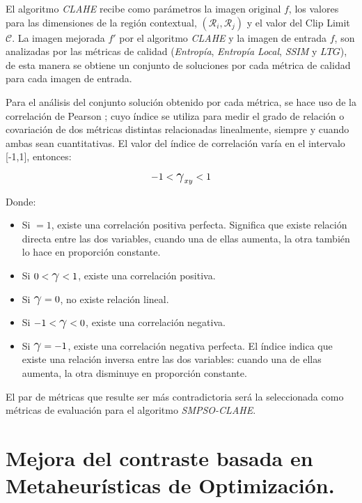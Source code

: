 El algoritmo \textit{CLAHE} recibe como parámetros la imagen original $f$, los valores para las dimensiones de la región contextual,  $(\mathcal{R}_i,\mathcal{R}_j)$ y el valor del Clip Limit $\mathscr{C}$. 
La imagen mejorada $f'$ por el algoritmo \textit{CLAHE} y la imagen de entrada $f$, son analizadas por las métricas de calidad (\textit{Entropía}, \textit{Entropía Local}, \textit{SSIM} y $LTG$), de esta manera se obtiene un conjunto de soluciones por cada métrica de calidad para cada imagen de entrada.

Para el análisis del conjunto solución obtenido por cada métrica, se hace uso de la correlación de Pearson \cite{correlacion}; cuyo índice se utiliza para medir el grado de relación o covariación de dos métricas distintas relacionadas linealmente, siempre y cuando ambas sean cuantitativas. El valor del índice de correlación varía en el intervalo [-1,1], entonces:


\begin{equation}\label{eq:correlacion}
-1 < \text{\Large{$\gamma$}}_{xy} < 1
\end{equation}

Donde:
\begin{itemize}
\item Si \text{\Large{$\gamma$}}$= 1$, existe una correlación positiva perfecta. Significa que existe relación directa entre las dos variables, cuando una de ellas aumenta, la otra también lo hace en proporción constante.
\item Si $0<\text{\Large{$\gamma$}}<1$, existe una correlación positiva.
\item Si $\text{\Large{$\gamma$}}= 0$, no existe relación lineal.
\item Si $-1<\text{\Large{$\gamma$}}<0$, existe una correlación negativa.
\item Si $\text{\Large{$\gamma$}} = -1$, existe una correlación negativa perfecta. El índice indica que existe una relación inversa entre las dos variables: cuando una de ellas aumenta, la otra disminuye en proporción constante.
\end{itemize}

El par de métricas que resulte ser más contradictoria será la seleccionada como métricas de evaluación para el algoritmo \textit{SMPSO-CLAHE}.

\section{Mejora del contraste basada en Metaheurísticas de Optimización.}
\label{sec:mejora_opti}


